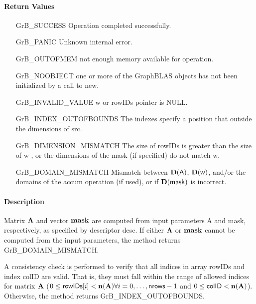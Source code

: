\paragraph{Return Values}

\begin{itemize}[leftmargin=2.1in]
\item[{\sf GrB\_SUCCESS}]             Operation completed successfully.
\item[{\sf GrB\_PANIC}]               Unknown internal error.
\item[{\sf GrB\_OUTOFMEM}]    not enough memory available for operation.
\item[{\sf GrB\_NOOBJECT}]   one or more of the GraphBLAS objects has
                             not been initialized by a call to {\sf new}.
\item[{\sf GrB\_INVALID\_VALUE}]    {\sf w} or {\sf rowIDs} pointer is {\sf NULL}.

\item[{\sf GrB\_INDEX\_OUTOFBOUNDS}]  The indexes specify a position that outside the dimensions of src.
\item[{\sf GrB\_DIMENSION\_MISMATCH}] 
       The size of {\sf rowIDs} is greater than the size of {\sf w} , 
       or the dimensions of the mask (if specified) do not match {\sf w}.
\item[{\sf GrB\_DOMAIN\_MISMATCH}]    Mismatch between $\bold{D}(\sf A)$, 
                                      $\bold{D}({\sf w})$, and/or the domains of the 
                                      {\sf accum} operation (if used), or if $\bold{D}(\sf mask)$ is incorrect.
\end{itemize}

\paragraph{Description}

Matrix ${\bf A}$ and vector ${\bf mask}$ are computed from input
parameters {\sf A} and {\sf mask}, respectively, as specified by
descriptor {\sf desc}.  If either ${\bf A}$ or ${\bf mask}$
cannot be computed from the input parameters, the method returns {\sf
GrB\_DOMAIN\_MISMATCH}.

A consistency check is performed to verify that all indices in array
{\sf rowIDs} and index {\sf colID} are valid. That is, they must fall within the range of allowed
indices for matrix ${\bf A}$ ($0 \leq {\sf rowIDs}[i] < \bold{n}({\bf A})
\forall i = 0,\ldots,{\sf nrows}-1$ and
$0 \leq {\sf colID} < \bold{n}({\bf A})$).  Otherwise, the method returns {\sf
GrB\_INDEX\_OUTOFBOUNDS}.

